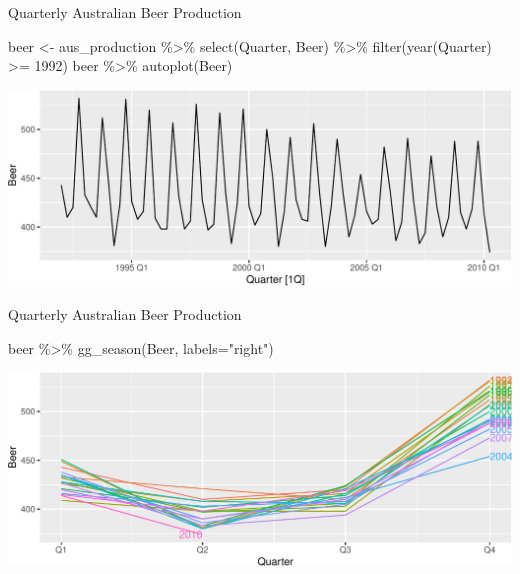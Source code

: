 \documentclass[14pt,ignorenonframetext,aspectratio=169]{beamer}
\newenvironment{Shaded}{\begin{snugshade}}{\end{snugshade}}
\newcommand{\AttributeTok}[1]{\textcolor[rgb]{0.77,0.63,0.00}{#1}}
\newcommand{\DecValTok}[1]{\textcolor[rgb]{0.00,0.00,0.81}{#1}}
\newcommand{\FunctionTok}[1]{\textcolor[rgb]{0.00,0.00,0.00}{#1}}
\newcommand{\NormalTok}[1]{#1}
\newcommand{\OtherTok}[1]{\textcolor[rgb]{0.56,0.35,0.01}{#1}}
\newcommand{\SpecialCharTok}[1]{\textcolor[rgb]{0.00,0.00,0.00}{#1}}
\newcommand{\StringTok}[1]{\textcolor[rgb]{0.31,0.60,0.02}{#1}}
\renewenvironment{Shaded}{\color{black}\begin{snugshade}\color{black}}{\end{snugshade}}
\renewenvironment{Shaded}{\color{black}\fontsize{10}{10}\sf\begin{snugshade}\color{black}}{\end{snugshade}}
\begin{document}
\begin{frame}[fragile]{Quarterly Australian Beer Production}
\protect\hypertarget{quarterly-australian-beer-production}{}
\fontsize{9}{9}\sf

\begin{Shaded}
\begin{Highlighting}[]
\NormalTok{beer }\OtherTok{\textless{}{-}}\NormalTok{ aus\_production }\SpecialCharTok{\%\textgreater{}\%}
  \FunctionTok{select}\NormalTok{(Quarter, Beer) }\SpecialCharTok{\%\textgreater{}\%}
  \FunctionTok{filter}\NormalTok{(}\FunctionTok{year}\NormalTok{(Quarter) }\SpecialCharTok{\textgreater{}=} \DecValTok{1992}\NormalTok{)}
\NormalTok{beer }\SpecialCharTok{\%\textgreater{}\%} \FunctionTok{autoplot}\NormalTok{(Beer)}
\end{Highlighting}
\end{Shaded}

\includegraphics{2-tsgraphics_files/figure-beamer/unnamed-chunk-14-1.pdf}
\end{frame}

\begin{frame}[fragile]{Quarterly Australian Beer Production}
\protect\hypertarget{quarterly-australian-beer-production-1}{}
\fontsize{9}{9}\sf

\begin{Shaded}
\begin{Highlighting}[]
\NormalTok{beer }\SpecialCharTok{\%\textgreater{}\%} \FunctionTok{gg\_season}\NormalTok{(Beer, }\AttributeTok{labels=}\StringTok{"right"}\NormalTok{)}
\end{Highlighting}
\end{Shaded}

\includegraphics{2-tsgraphics_files/figure-beamer/unnamed-chunk-15-1.pdf}
\end{frame}
\end{document}

